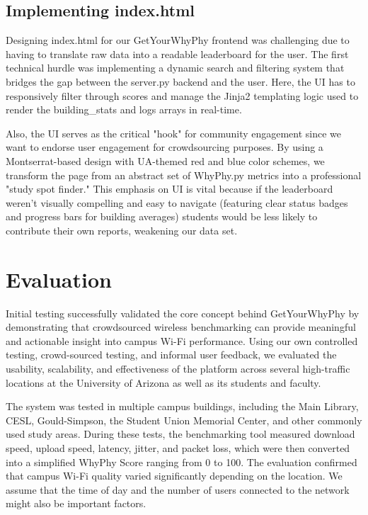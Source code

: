 \documentclass[sigconf]{acmart}
\begin{document}
\subsection{Implementing index.html}
Designing index.html for our GetYourWhyPhy frontend was challenging due to having to translate raw data into a readable leaderboard for the user. The first technical hurdle was implementing a dynamic search and filtering system that bridges the gap between the server.py backend and the user. Here, the UI has to responsively filter through scores and manage the Jinja2 templating logic used to render the building\_stats and logs arrays in real-time.

Also, the UI serves as the critical "hook" for community engagement since we want to endorse user engagement for crowdsourcing purposes. By using a Montserrat-based design with UA-themed red and blue color schemes, we transform the page from an abstract set of WhyPhy.py metrics into a professional "study spot finder." This emphasis on UI is vital because if the leaderboard weren't visually compelling and easy to navigate (featuring clear status badges and progress bars for building averages) students would be less likely to contribute their own reports, weakening our data set.

\section{Evaluation}
Initial testing successfully validated the core concept behind GetYourWhyPhy by demonstrating that crowdsourced wireless benchmarking can provide meaningful and actionable insight into campus Wi-Fi performance. Using our own controlled testing, crowd-sourced testing, and informal user feedback, we evaluated the usability, scalability, and effectiveness of the platform across several high-traffic locations at the University of Arizona as well as its students and faculty.

The system was tested in multiple campus buildings, including the Main Library, CESL, Gould-Simpson, the Student Union Memorial Center, and other commonly used study areas. During these tests, the benchmarking tool measured download speed, upload speed, latency, jitter, and packet loss, which were then converted into a simplified WhyPhy Score ranging from 0 to 100. The evaluation confirmed that campus Wi-Fi quality varied significantly depending on the location. We assume that the time of day and the number of users connected to the network might also be important factors.
\end{document}
